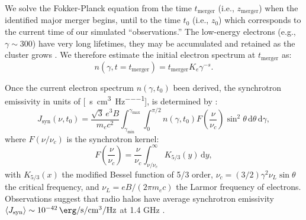 \documentclass[modern]{aastex61}
\newcommand{\R}[1]{\mathrm{#1}}
\newcommand{\D}[1]{\R{d} #1}
\begin{document}
We solve the Fokker-Planck equation from the time $t_{\R{merger}}$
(i.e., $z_{\R{merger}}$) when the identified major merger begins,
until to the time $t_0$ (i.e., $z_0$) which corresponds to the current
time of our simulated \enquote{observations.}
The low-energy electrons (e.g., $\gamma \sim 300$) have very long
lifetimes, they may be accumulated and retained as the cluster
grows \citep{sarazin1999}.
We therefore estimate the initial electron spectrum at $t_{\R{merger}}$ as:
\begin{equation}
  \label{eq:ne-init}
  n(\gamma, t=t_{\R{merger}}) = t_{\R{merger}} K_e \gamma^{-s}.
\end{equation}

Once the current electron spectrum $n(\gamma, t_0)$ been derived,
the synchrotron emissivity in units of
[\si{\erg\per\second\per\cm\cubed\per\hertz}],
is determined by \citep{rybicki1979}:
\begin{equation}
  \label{sec:jnu-sync}
  J_{\R{syn}}(\nu, t_0) = \frac{\sqrt{3} \, e^3 B}{m_e c^2}
  \int_{\gamma_{\R{min}}}^{\gamma_{\R{max}}} \int_0^{\pi/2}
  n(\gamma, t_0) F\!\left( \frac{\nu}{\nu_c} \right) \sin^2 \!\theta
  \,\D{\theta} \,\D{\gamma},
\end{equation}
where $F(\nu/\nu_c)$ is the synchrotron kernel:
\begin{equation}
  \label{eq:sync-kernel}
  F\!\left( \frac{\nu}{\nu_c} \right) = \frac{\nu}{\nu_c}
  \int_{\nu/\nu_c}^{\infty} K_{5/3}(y) \,\D{y},
\end{equation}
with $K_{5/3}(x)$ the modified Bessel function of 5/3 order,
$\nu_c = (3/2) \gamma^2 \nu_L \sin\theta$ the critical frequency,
and $\nu_L = e B / (2\pi m_e c)$ the Larmor frequency of electrons.
Observations suggest that radio halos have average synchrotron emissivity
$\langle {J_{\R{syn}}} \rangle \sim \SI{e-42}{\erg\per\second\per\cm\cubed\per\hertz}$
at 1.4 GHz \citep{murgia2009,feretti2012rev}.
\end{document}
